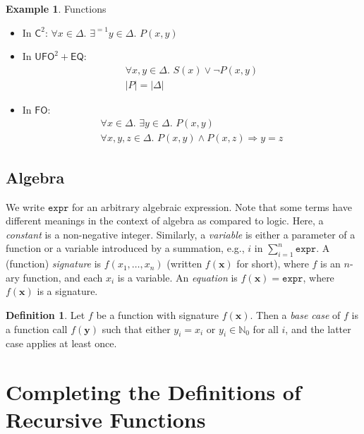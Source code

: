 \documentclass{article}
\theoremstyle{definition}
\newtheorem{definition}{Definition}
\newtheorem{example}{Example}
\newcommand{\expr}{\mathtt{expr}}
\newcommand{\Ctwo}{$\mathsf{C}^{2}$}
\newcommand{\FO}{$\mathsf{FO}$}
\newcommand{\UFO}{$\mathsf{UFO}^{2} + \mathsf{EQ}$}
\begin{document}
\begin{example}\label{example:functions}
  Functions
  \begin{itemize}
    \item In \Ctwo: $\forall x \in \Delta\text{.
          }\exists^{=1} y \in \Delta\text{. }P(x, y)$
    \item In \UFO:
          \begin{gather*}
            \forall x, y \in \Delta\text{. }S(x) \lor \neg P(x, y)\\
            |P| = |\Delta|
          \end{gather*}
    \item In \FO:
          \begin{gather*}
            \forall x \in \Delta\text{. }\exists y \in \Delta\text{. }P(x, y)\\
            \forall x, y, z \in \Delta\text{. }P(x, y) \land P(x, z) \Rightarrow y = z
          \end{gather*}
  \end{itemize}
\end{example}

\subsection{Algebra}\label{sec:algebra}

We write $\expr{}$ for an arbitrary algebraic expression. Note that some terms
have different meanings in the context of algebra as compared to logic. Here, a
\emph{constant} is a non-negative integer. Similarly, a \emph{variable} is
either a parameter of a function or a variable introduced by a summation, e.g.,
$i$ in $\sum_{i=1}^{n} \expr$. A (function) \emph{signature} is
$f(x_{1}, \dots, x_{n})$ (written $f(\mathbf{x})$ for short), where $f$ is an
$n$-ary function, and each $x_{i}$ is a variable. An \emph{equation} is
$f(\mathbf{x}) = \expr{}$, where $f(\mathbf{x})$ is a signature.

\begin{definition}
  Let $f$ be a function with signature $f(\mathbf{x})$. Then a \emph{base case}
  of $f$ is a function call $f(\mathbf{y})$ such that either $y_{i} = x_{i}$ or
  $y_{i} \in \mathbb{N}_{0}$ for all $i$, and the latter case applies at least
  once.
\end{definition}

\section{Completing the Definitions of Recursive Functions}\label{sec:main}
\end{document}
